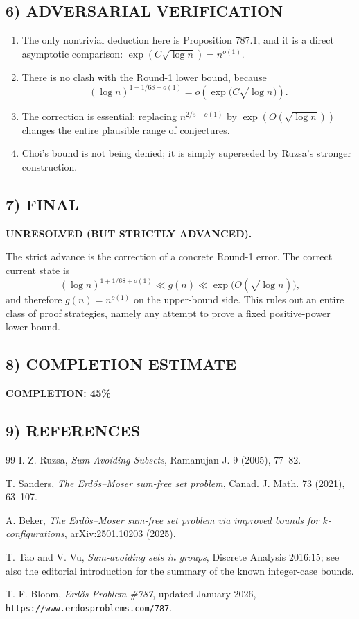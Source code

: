 \subsection*{6) ADVERSARIAL VERIFICATION}
\begin{enumerate}
\item The only nontrivial deduction here is Proposition 787.1, and it is a direct asymptotic comparison: $\exp(C\sqrt{\log n}) = n^{o(1)}$.
\item There is no clash with the Round-1 lower bound, because
\[
 (\log n)^{1+1/68+o(1)} = o\!\left(\exp\!\bigl(C\sqrt{\log n}\bigr)\right).
\]
\item The correction is essential: replacing $n^{2/5+o(1)}$ by $\exp(O(\sqrt{\log n}))$ changes the entire plausible range of conjectures.
\item Choi's bound is not being denied; it is simply superseded by Ruzsa's stronger construction.
\end{enumerate}

\subsection*{7) FINAL}
\textbf{UNRESOLVED (BUT STRICTLY ADVANCED).}

The strict advance is the correction of a concrete Round-1 error. The correct current state is
\[
 (\log n)^{1+1/68+o(1)} \ll g(n) \ll \exp\!\bigl(O(\sqrt{\log n})\bigr),
\]
and therefore $g(n)=n^{o(1)}$ on the upper-bound side. This rules out an entire class of proof strategies, namely any attempt to prove a fixed positive-power lower bound.

\subsection*{8) COMPLETION ESTIMATE}
\textbf{COMPLETION: 45\%}

\subsection*{9) REFERENCES}
\begin{thebibliography}{99}
I. Z. Ruzsa,
\emph{Sum-Avoiding Subsets},
Ramanujan J. 9 (2005), 77--82.

T. Sanders,
\emph{The Erd\H{o}s--Moser sum-free set problem},
Canad. J. Math. 73 (2021), 63--107.

A. Beker,
\emph{The Erd\H{o}s--Moser sum-free set problem via improved bounds for $k$-configurations},
arXiv:2501.10203 (2025).

T. Tao and V. Vu,
\emph{Sum-avoiding sets in groups},
Discrete Analysis 2016:15; see also the editorial introduction for the summary of the known integer-case bounds.

T. F. Bloom,
\emph{Erd\H{o}s Problem \#787}, updated January 2026,
\texttt{https://www.erdosproblems.com/787}.
\end{thebibliography}

